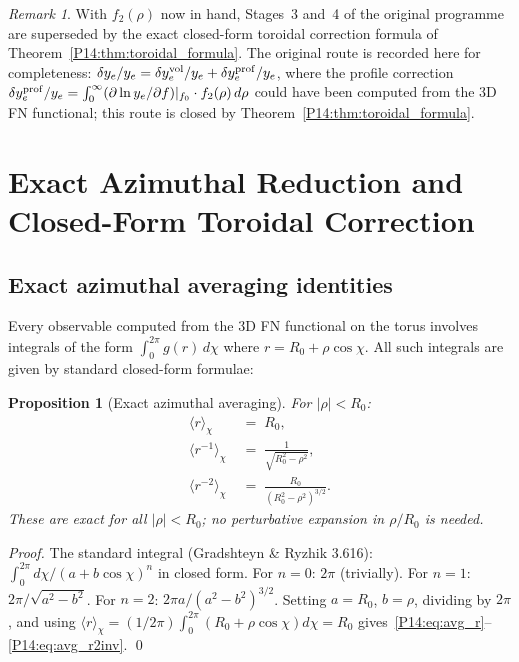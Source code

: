 \documentclass[11pt,a4paper]{article}
\newtheorem{proposition}[theorem]{Proposition}
\theoremstyle{definition}
\theoremstyle{remark}
\newtheorem{remark}[theorem]{Remark}
\newcommand{\fzero}{f_0}
\newcommand{\ftwo}{f_2}
\newcommand{\Rzero}{R_0}
\begin{document}
\begin{remark}
\label{P14:rem:yukawa}
With $\ftwo(\rho)$ now in hand, Stages~3 and~4 of the original
programme are superseded by the exact closed-form
toroidal correction formula of Theorem~\ref{P14:thm:toroidal_formula}.
The original route is recorded here for completeness:
$\delta y_e/y_e = \delta y_e^{\rm vol}/y_e + \delta y_e^{\rm prof}/y_e$,
where the profile correction
$\delta y_e^{\rm prof}/y_e = \int_0^\infty (\partial\ln y_e/\partial f)|_{\fzero}\cdot\ftwo(\rho)\,d\rho$
could have been computed from the 3D FN functional; this route is
closed by Theorem~\ref{P14:thm:toroidal_formula}.
\end{remark}

\section{Exact Azimuthal Reduction and Closed-Form Toroidal Correction}
\label{P14:sec:analytic}

\subsection{Exact azimuthal averaging identities}

Every observable computed from the 3D FN functional on the torus
involves integrals of the form $\int_0^{2\pi} g(r)\,d\chi$ where
$r = \Rzero + \rho\cos\chi$.
All such integrals are given by standard closed-form formulae:

\begin{proposition}[Exact azimuthal averaging]
\label{P14:prop:exact_avg}
For $|\rho| < \Rzero$:
\begin{align}
  \bigl\langle r\bigr\rangle_\chi
  &\;=\; \Rzero,
  \label{P14:eq:avg_r}\\
  \bigl\langle r^{-1}\bigr\rangle_\chi
  &\;=\; \boxed{\frac{1}{\sqrt{\Rzero^2-\rho^2}},}
  \label{P14:eq:avg_rinv}\\
  \bigl\langle r^{-2}\bigr\rangle_\chi
  &\;=\; \frac{\Rzero}{(\Rzero^2-\rho^2)^{3/2}}.
  \label{P14:eq:avg_r2inv}
\end{align}
These are exact for all $|\rho|<\Rzero$; no perturbative expansion
in $\rho/\Rzero$ is needed.
\end{proposition}

\begin{proof}
The standard integral (Gradshteyn \& Ryzhik 3.616):
$\int_0^{2\pi}d\chi/(a+b\cos\chi)^n$ in closed form.
For $n=0$: $2\pi$ (trivially).
For $n=1$: $2\pi/\sqrt{a^2-b^2}$.
For $n=2$: $2\pi a/(a^2-b^2)^{3/2}$.
Setting $a=\Rzero$, $b=\rho$, dividing by $2\pi$,
and using $\langle r\rangle_\chi=(1/2\pi)\int_0^{2\pi}(\Rzero+\rho\cos\chi)d\chi=\Rzero$
gives~\eqref{P14:eq:avg_r}--\eqref{P14:eq:avg_r2inv}.
\qed
\end{proof}
\end{document}
